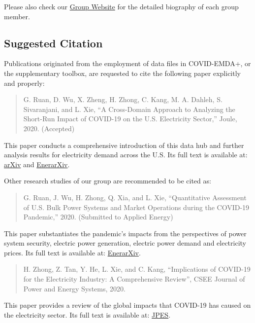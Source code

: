 \documentclass[11pt]{article}
\numberwithin{equation}{section}
\numberwithin{table}{section}
\numberwithin{figure}{section}
\begin{document}
Please also check our \href{https://gridx.engr.tamu.edu/?page_id=30}{Group Website} for the detailed biography of each group member.

\subsection{Suggested Citation}
Publications originated from the employment of data files in COVID-EMDA+, or the supplementary toolbox, are requested to cite the following paper explicitly and properly: 

\begin{quotation}\footnotesize
G. Ruan, D. Wu, X. Zheng, H. Zhong, C. Kang, M. A. Dahleh, S. Sivaranjani, and L. Xie, ``A Cross-Domain Approach to Analyzing the Short-Run Impact of COVID-19 on the U.S. Electricity Sector,'' Joule, 2020. (Accepted)
\end{quotation}

This paper conducts a comprehensive introduction of this data hub and further analysis results for electricity demand across the U.S. Its full text is available at: \href{https://arxiv.org/abs/2005.06631}{arXiv} and \href{http://www.enerarxiv.org/page/thesis.html?id=1840}{EnerarXiv}.

Other research studies of our group are recommended to be cited as:

\begin{quotation}\footnotesize
G. Ruan, J. Wu, H. Zhong, Q. Xia, and L. Xie, ``Quantitative Assessment of U.S. Bulk Power Systems and Market Operations during the COVID-19 Pandemic,'' 2020. (Submitted to Applied Energy)
\end{quotation}

This paper substantiates the pandemic's impacts from the perspectives of power system security, electric power generation, electric power demand and electricity prices. Its full text is available at: \href{http://www.enerarxiv.org/page/thesis.html?id=2196}{EnerarXiv}.

\begin{quotation}\footnotesize
H. Zhong, Z. Tan, Y. He, L. Xie, and C. Kang, ``Implications of COVID-19 for the Electricity Industry: A Comprehensive Review'', CSEE Journal of Power and Energy Systems, 2020.
\end{quotation}

This paper provides a review of the global impacts that COVID-19 has caused on the electricity sector. Its full text is available at: \href{https://ieeexplore.ieee.org/abstract/document/9160443}{JPES}.
\end{document}
